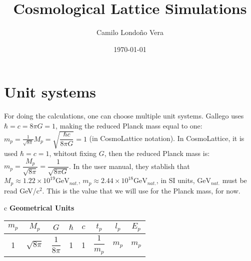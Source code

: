 \documentclass{article}
\begin{document}
\title{Cosmological Lattice Simulations}
\author{Camilo Londoño Vera}
\date{\today}
\maketitle



\section{Unit systems}
\label{sec:introduction}
For doing the calculations, one can choose multiple unit systems. Gallego uses $\hbar=c=8\pi G=1$, making the reduced Planck mass equal to one: $m_p=\frac{1}{\sqrt{8\pi}}M_p=\sqrt{\dfrac{\hbar c}{8\pi G}}=1$ (in CosmoLattice notation). In CosmoLattice, it is used $\hbar=c=1$, whitout fixing $G$, then the reduced Planck mass is: $m_p=\dfrac{M_p}{\sqrt{8\pi}}=\dfrac{1}{\sqrt{8\pi G}}$. In the user manual, they stablish that $M_p\approx1.22\times10^{19}\text{GeV}_{nat.}$, $m_p\approx2.44\times10^{18}\text{GeV}_{nat.}$, in SI units, $\text{GeV}_{nat.}$ must be read GeV/c$^2$. This is the value that we will use for the Planck mass, for now.
\begin{center}
    
\begin{tabular}{c} 
    \textbf{Geometrical Units}\\
    \begin{tabular}{|c|c|c|c|c|c|c|c|}
        \hline
        
        \hline
        $m_p$ & $M_p$ & $G$ & $\hbar$ & $c$ & $t_p$ & $l_p$ & $E_p$ \\
        \hline
        1 & $\sqrt{8\pi}$ & $\dfrac{1}{8\pi}$ & 1 & 1 & $\dfrac{1}{m_p}$ & $m_p$ & $m_p$ \\
        \hline
    \end{tabular}
\end{tabular}

\end{center}
\end{document}
